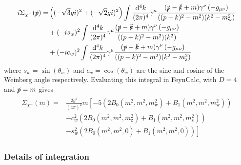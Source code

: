 \documentclass[11pt]{article}
\def\sp{\slashed{p}}
\def\cm{\chi^-}
\renewcommand{\d}{\ensuremath{\operatorname{d}\!}}
\begin{document}
\begin{align}
\begin{split}
i\Sigma_{\cm}(\slashed{p})=&\left((-\sqrt{3}gi)^2+(-\sqrt{2}gi)^2\right) \int \frac{\d^4k}{(2\pi)^4} \gamma^{\mu}\frac{(\slashed{p}-\slashed{k}+m)\gamma^{\nu}\left(-g_{\mu\nu}\right)}{((p-k)^2-m^2)(k^2-m_{\text{w}}^2)}\\
&+(-is_w)^2 \int \frac{\d^4k}{(2\pi)^4} \gamma^{\mu}\frac{(\slashed{p}-\slashed{k}+m)\gamma^{\nu}\left(-g_{\mu\nu}\right)}{((p-k)^2-m^2)(k^2)}\\
&+(-ic_w)^2 \int \frac{\d^4k}{(2\pi)^4} \gamma^{\mu}\frac{(\slashed{p}-\slashed{k}+m)\gamma^{\nu}\left(-g_{\mu\nu}\right)}{((p-k)^2-m^2)(k^2-m_{\text{z}}^2)}
\end{split}
\end{align}
where $s_w=\sin(\theta_w)$ and $c_w=\cos(\theta_w)$ are the sine and cosine of the Weinberg angle respectively.  Evaluating this integral in FeynCalc, with $D=4$ and $\sp=m$ gives
\begin{align}
\begin{split}
\Sigma_{\cm}(m)=& \frac{2g^2}{(4\pi)^2} m \left[  -5(2B_0(m^2,m^2,m_{\text{w}}^2)+B_1(m^2,m^2,m_{\text{w}}^2)) \right.\\ & -c_w^2 (2B_0(m^2,m^2,m_{\text{z}}^2)+B_1(m^2,m^2,m_{\text{z}}^2)) \\&\left.-s_w^2(2B_0(m^2,m^2,0)+B_1(m^2,m^2,0))\right]\label{eqn:charged_SE}
\end{split}
\end{align}




\subsubsection{Details of integration}
\end{document}
